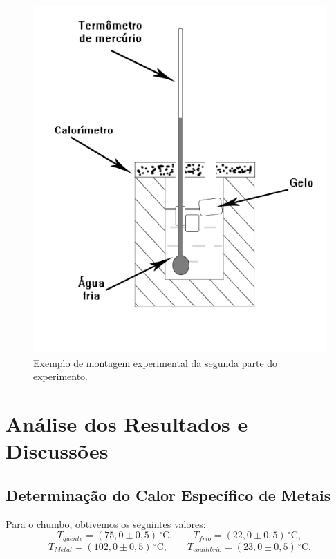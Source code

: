 \documentclass[12pt,a4paper]{article}
\begin{document}
\begin{figure}[!htbp]
\centering
\includegraphics[scale=0.55]{Fig6b2.jpg}
\caption{Exemplo de montagem experimental da segunda parte do experimento.}
\label{CalorGelo}
\end{figure}


\section{Análise dos Resultados e Discussões}


\subsection{Determinação do Calor Específico de Metais}

Para o chumbo, obtivemos os seguintes valores:
$$ T_{quente} = (75,0 \pm 0,5)\,^{\circ}\mathrm{C}, \qquad T_{frio} = (22,0 \pm 0,5)\,^{\circ}\mathrm{C}, $$
$$ T_{Metal} = (102,0 \pm 0,5)\,^{\circ}\mathrm{C}, \qquad T_{equilibrio} = (23,0 \pm 0,5)\,^{\circ}\mathrm{C}. $$
\end{document}
